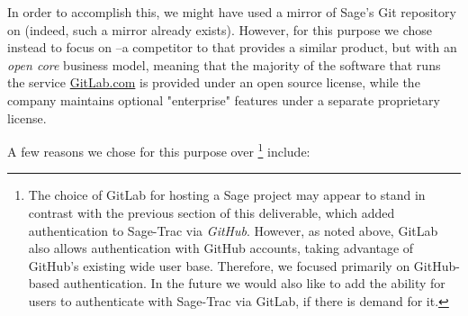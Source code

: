 In order to accomplish this, we might have used a mirror of Sage's Git
repository on \GitHub (indeed, such a mirror already exists).  However, for
this purpose we chose instead to focus on \GitLab--a competitor to \GitHub that
provides a similar product, but with an {\em open core} business model, meaning
that the majority of the software that runs the service \url{GitLab.com} is
provided under an open source license, while the company maintains optional
"enterprise" features under a separate proprietary license.

A few reasons we chose \GitLab for this purpose over \GitHub \footnote{The
choice of GitLab for hosting a Sage project may appear to stand in contrast
with the previous section of this deliverable, which added authentication to
Sage-Trac via {\em GitHub}.  However, as noted above, GitLab also allows
authentication with GitHub accounts, taking advantage of GitHub's existing wide
user base.  Therefore, we focused primarily on GitHub-based authentication.  In
the future we would also like to add the ability for users to authenticate with
Sage-Trac via GitLab, if there is demand for it.} include:

